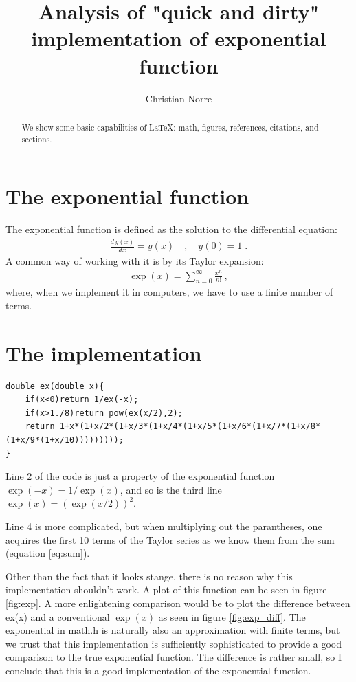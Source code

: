 \documentclass[twocolumn]{article}
\title{Analysis of "quick and dirty" implementation of exponential function}
\author{Christian Norre}
\date{}
\begin{document}
\maketitle

\begin{abstract}
We show some basic capabilities of \LaTeX: math, figures,
references, citations, and sections.
\end{abstract}

\section{The exponential function}
The exponential function is defined as the solution to the differential equation:
\begin{align}
\frac{d\,y(x)}{dx} = y(x)\quad,\quad y(0)=1\;.
\end{align}
A common way of working with it is by its Taylor expansion:
\begin{align} 
\exp(x) = \sum_{n=0}^\infty \frac{x^n}{n!}\,, \label{eq:sum}
\end{align}
where, when we implement it in computers, we have to use a finite number of terms.

\section{The implementation}

\begin{lstlisting}
double ex(double x){
	if(x<0)return 1/ex(-x);
	if(x>1./8)return pow(ex(x/2),2);
	return 1+x*(1+x/2*(1+x/3*(1+x/4*(1+x/5*(1+x/6*(1+x/7*(1+x/8*(1+x/9*(1+x/10)))))))));
}
\end{lstlisting}

Line 2 of the code is just a property of the exponential function $\exp(-x)=1/\exp(x)$, and so is the third line $\exp(x)=(\exp(x/2))^2$.

Line 4 is more complicated, but when multiplying out the parantheses, one acquires the first 10 terms of the Taylor series as we know them from the sum (equation \ref{eq:sum}).

Other than the fact that it looks stange, there is no reason why this implementation shouldn't work. A plot of this function can be seen in figure \ref{fig:exp}. A more enlightening comparison would be to plot the difference between ex(x) and a conventional $\exp(x)$ as seen in figure \ref{fig:exp_diff}. The exponential in math.h is naturally also an approximation with finite terms, but we trust that this implementation is sufficiently sophisticated to provide a good comparison to the true exponential function. The difference is rather small, so I conclude that this is a good implementation of the exponential function.
\end{document}
